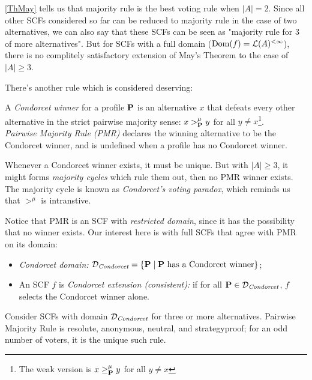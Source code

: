 \cref{ThMay} tells us that majority rule is the best voting rule when $|A| = 2$. Since all other SCFs considered so far can be reduced to majority rule in the case of two alternatives, we can also say that these SCFs can be seen as "majority rule for 3 of more alternatives". But for SCFs with a full domain ($\mathrm{Dom}(f) = \mathcal{L}(A)^{<\infty}$), there is no complitely satisfactory extension of May's Theorem to the case of $|A| \geq 3$.

There's another rule which is considered deserving:

\begin{definition}
    A \textit{Condorcet winner} for a profile $\mathbf{P}$ is an alternative $x$ that defeats every other alternative in the strict pairwise majority sense: $x >^\mu_{\mathbf{P}} y$ for all $y \neq x$\footnote{The weak version is $x \geq^\mu_{\mathbf{P}} y$ for all $y \neq x$}.\\
    \textit{Pairwise Majority Rule (PMR)} declares the winning alternative to be the Condorcet winner, and is undefined when a profile has no Condorcet winner.
\end{definition}

Whenever a Condorcet winner exists, it must be unique. But with $|A| \geq 3$, it might forms \textit{majority cycles} which rule them out, then no PMR winner exists. The majority cycle is known as \textit{Condorcet's voting paradox}, which reminds us that $>^\mu$ is intranstive.

Notice that PMR is an SCF with \textit{restricted domain}, since it has the possibility that no winner exists. Our interest here is with full SCFs that agree with PMR on its domain:

\begin{definition}
    \begin{itemize}
        \item \textit{Condorcet domain:} $\mathcal{D}_\textit{Condorcet} = \{\mathbf{P}\;|\; \mathbf{P} \mbox{ has a Condorcet winner}\}$;
        \item An SCF $f$ is \textit{Condorcet extension (consistent):} if for all $\mathbf{P} \in \mathcal{D}_\textit{Condorcet}$, $f$ selects the Condorcet winner alone.
    \end{itemize}
\end{definition}

\begin{theorem}
    \label{ThCK}
    Consider SCFs with domain $\mathcal{D}_\textit{Condorcet}$ for three or more alternatives. Pairwise Majority Rule is resolute, anonymous, neutral, and strategyproof; for an odd number of voters, it is the unique such rule.
\end{theorem}

